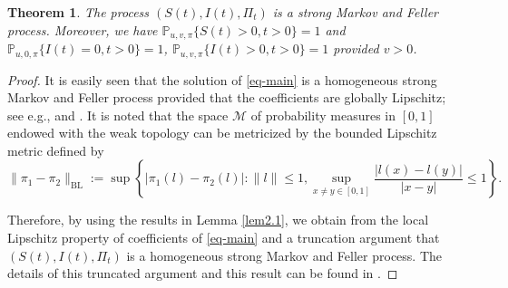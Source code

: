 \documentclass[12pt]{amsart}
\newtheorem{thm}{Theorem}[section]
\theoremstyle{remark}
\numberwithin{equation}{section}
\newcommand{\M}{\mathcal{M}}
\newcommand{\PP}{\mathbb{P}}
\numberwithin{equation}{section}
\newcommand{\PPi}{\PP_{u,v,\pi}}
\newcommand{\1}{\boldsymbol{1}}
\begin{document}
\begin{thm}\label{thm-markov}
	The
process $(S(t),I(t),\Pi_t)$ is a strong Markov and Feller process.
	Moreover, we have
	$\PPi\{S(t)>0, t>0\}=1$ and
	$\PP_{u,0,\pi}\{I(t)=0, t>0\}=1$,
	$\PPi\{I(t)>0, t>0\}=1$ provided $v>0$.
\end{thm}

\begin{proof}
It is easily seen that
the solution of \eqref{eq-main} is a homogeneous strong Markov and Feller process provided that the coefficients are globally
Lipschitz; see e.g., \cite[Theorem 2.9.3]{MAO} and \cite[Section 2.5]{YIN}.
It is noted that the space $\M$ of probability measures in $[0,1]$ endowed with the weak topology can be metricized by the bounded Lipschitz metric defined by
$$
\|\pi_1-\pi_2\|_{\text{BL}}:=\sup\left\{|\pi_1(l)-\pi_2(l)|: \|l\|\leq 1, \sup_{x\neq y\in[0,1]}\frac{|l(x)-l(y)|}{|x-y|}\leq 1\right\}.
$$

Therefore, by using the results in Lemma \ref{lem2.1}, we obtain from the local Lipschitz property of coefficients of \eqref{eq-main} and a truncation
argument that $(S(t),I(t),\Pi_t)$ is a homogeneous strong Markov and Feller process.
The details of this truncated argument and this result can be found in \cite[Theorem 5.1]{NYZ17}.




\end{proof}
\end{document}
